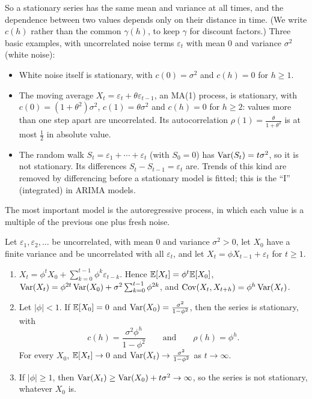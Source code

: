 So a stationary series has the same mean and variance at all times, and the dependence between two values depends only on their distance in time. (We write $c(h)$ rather than the common $\gamma(h)$, to keep $\gamma$ for discount factors.) Three basic examples, with uncorrelated noise terms $\varepsilon_t$ with mean $0$ and variance $\sigma^2$ (white noise):
\begin{itemize}
    \item White noise itself is stationary, with $c(0) = \sigma^2$ and $c(h) = 0$ for $h \geq 1$.
    \item The moving average $X_t = \varepsilon_t + \theta\varepsilon_{t-1}$, an MA(1) process, is stationary, with $c(0) = (1 + \theta^2)\sigma^2$, $c(1) = \theta\sigma^2$ and $c(h) = 0$ for $h \geq 2$: values more than one step apart are uncorrelated. Its autocorrelation $\rho(1) = \frac{\theta}{1 + \theta^2}$ is at most $\frac{1}{2}$ in absolute value.
    \item The random walk $S_t = \varepsilon_1 + \cdots + \varepsilon_t$ (with $S_0 = 0$) has $\operatorname{Var}(S_t) = t\sigma^2$, so it is not stationary. Its differences $S_t - S_{t-1} = \varepsilon_t$ are. Trends of this kind are removed by differencing before a stationary model is fitted; this is the ``I'' (integrated) in ARIMA models.
\end{itemize}

The most important model is the autoregressive process, in which each value is a multiple of the previous one plus fresh noise.

\begin{proposition}\label{L4-prop:ar1}
    Let $\varepsilon_1, \varepsilon_2, \ldots$ be uncorrelated, with mean $0$ and variance $\sigma^2 > 0$, let $X_0$ have a finite variance and be uncorrelated with all $\varepsilon_t$, and let $X_t = \phi X_{t-1} + \varepsilon_t$ for $t \geq 1$.
    \begin{enumerate}
        \item $X_t = \phi^tX_0 + \sum_{k=0}^{t-1}\phi^k\varepsilon_{t-k}$. Hence $\mathbb{E}[X_t] = \phi^t\mathbb{E}[X_0]$, $\operatorname{Var}(X_t) = \phi^{2t}\operatorname{Var}(X_0) + \sigma^2\sum_{k=0}^{t-1}\phi^{2k}$, and $\operatorname{Cov}(X_t, X_{t+h}) = \phi^h\operatorname{Var}(X_t)$.
        \item Let $|\phi| < 1$. If $\mathbb{E}[X_0] = 0$ and $\operatorname{Var}(X_0) = \frac{\sigma^2}{1 - \phi^2}$, then the series is stationary, with
        \[c(h) = \frac{\sigma^2\phi^h}{1 - \phi^2} \qquad \text{and} \qquad \rho(h) = \phi^h.\]
        For every $X_0$, $\mathbb{E}[X_t] \to 0$ and $\operatorname{Var}(X_t) \to \frac{\sigma^2}{1 - \phi^2}$ as $t \to \infty$.
        \item If $|\phi| \geq 1$, then $\operatorname{Var}(X_t) \geq \operatorname{Var}(X_0) + t\sigma^2 \to \infty$, so the series is not stationary, whatever $X_0$ is.
    \end{enumerate}
\end{proposition}

